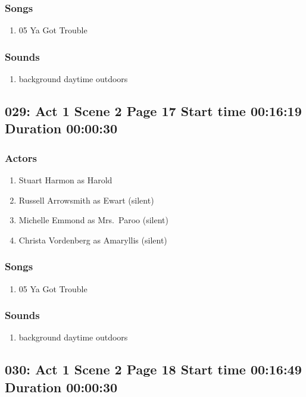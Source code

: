 \subsubsection{Songs}
\begin{enumerate}
\item 05 Ya Got Trouble
\end{enumerate}\subsubsection{Sounds}
\begin{enumerate}
\item background daytime outdoors
\end{enumerate}
\subsection{029: Act 1 Scene 2 Page 17 Start time 00:16:19 Duration 00:00:30}

\subsubsection{Actors}
\begin{enumerate}
\item Stuart Harmon as Harold
\item Russell Arrowsmith as Ewart (silent)
\item Michelle Emmond as Mrs.~Paroo (silent)
\item Christa Vordenberg as Amaryllis (silent)
\end{enumerate}

\subsubsection{Songs}
\begin{enumerate}
\item 05 Ya Got Trouble
\end{enumerate}\subsubsection{Sounds}
\begin{enumerate}
\item background daytime outdoors
\end{enumerate}
\subsection{030: Act 1 Scene 2 Page 18 Start time 00:16:49 Duration 00:00:30}

